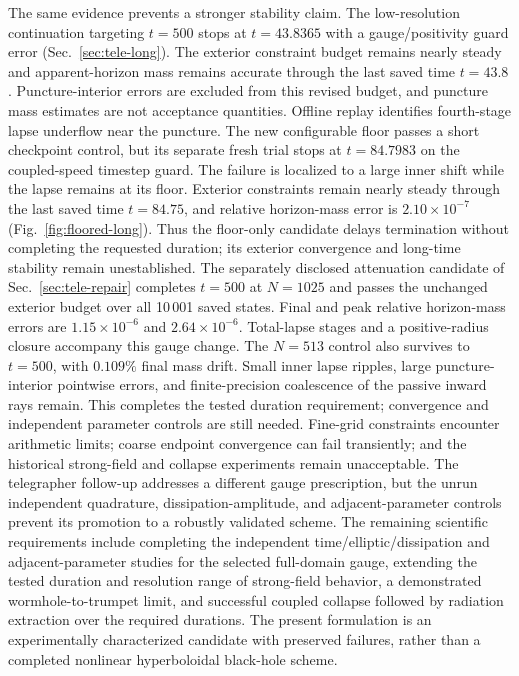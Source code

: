 The same evidence prevents a stronger stability claim. The low-resolution continuation targeting $t=500$ stops at $t=43.8365$ with a gauge/positivity guard error (Sec.~\ref{sec:tele-long}). The exterior constraint budget remains nearly steady and apparent-horizon mass remains accurate through the last saved time $t=43.8$. Puncture-interior errors are excluded from this revised budget, and puncture mass estimates are not acceptance quantities. Offline replay identifies fourth-stage lapse underflow near the puncture. The new configurable floor passes a short checkpoint control, but its separate fresh trial stops at $t=84.7983$ on the coupled-speed timestep guard. The failure is localized to a large inner shift while the lapse remains at its floor. Exterior constraints remain nearly steady through the last saved time $t=84.75$, and relative horizon-mass error is $2.10\times10^{-7}$ (Fig.~\ref{fig:floored-long}). Thus the floor-only candidate delays termination without completing the requested duration; its exterior convergence and long-time stability remain unestablished. The separately disclosed attenuation candidate of Sec.~\ref{sec:tele-repair} completes $t=500$ at $N=1025$ and passes the unchanged exterior budget over all 10\,001 saved states. Final and peak relative horizon-mass errors are $1.15\times10^{-6}$ and $2.64\times10^{-6}$. Total-lapse stages and a positive-radius closure accompany this gauge change. The $N=513$ control also survives to $t=500$, with $0.109\%$ final mass drift. Small inner lapse ripples, large puncture-interior pointwise errors, and finite-precision coalescence of the passive inward rays remain. This completes the tested duration requirement; convergence and independent parameter controls are still needed. Fine-grid constraints encounter arithmetic limits; coarse endpoint convergence can fail transiently; and the historical strong-field and collapse experiments remain unacceptable. The telegrapher follow-up addresses a different gauge prescription, but the unrun independent quadrature, dissipation-amplitude, and adjacent-parameter controls prevent its promotion to a robustly validated scheme. The remaining scientific requirements include completing the independent time/elliptic/dissipation and adjacent-parameter studies for the selected full-domain gauge, extending the tested duration and resolution range of strong-field behavior, a demonstrated wormhole-to-trumpet limit, and successful coupled collapse followed by radiation extraction over the required durations. The present formulation is an experimentally characterized candidate with preserved failures, rather than a completed nonlinear hyperboloidal black-hole scheme.
